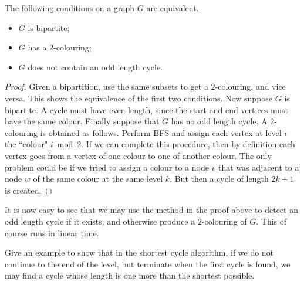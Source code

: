 \begin{Theorem} 
The following conditions on a graph $G$ are equivalent.
\begin{itemize}
\item
$G$ is bipartite;
\item
$G$ has a $2$-colouring;
\item
$G$ does not contain an odd length cycle.
\end{itemize}
\end{Theorem}

\begin{proof} 
Given a bipartition, use the same subsets to get a $2$-colouring, and
vice versa. This shows the equivalence of the first two conditions. Now
suppose $G$ is bipartite.  A cycle must have even length, since the start
and end vertices must have the same colour. Finally suppose that $G$
has no odd length cycle. A $2$-colouring is obtained as follows. Perform
BFS and assign each vertex at level $i$ the ``colour" $i \bmod 2$. If we
can complete this procedure, then by definition each vertex goes from
a vertex of one colour to one of another colour. The only problem could
be if we tried to assign a colour to a node $v$ that was adjacent to a
node $w$ of the same colour at the same level $k$. But then a cycle of
length $2k+1$ is created.
\end{proof}

It is now easy to see that we may use the method in the proof above
to detect an odd length cycle if it exists, and otherwise produce a
$2$-colouring of $G$. This of course runs in linear time.


\begin{Exercise}
\label{ex:shortest-cycle-thm}
Give an example to show that in the shortest cycle algorithm, if we
do not continue to the end of the level, but terminate when the first
cycle is found, we may find a cycle whose length is one more than the
shortest possible.
\end{Exercise}

%

